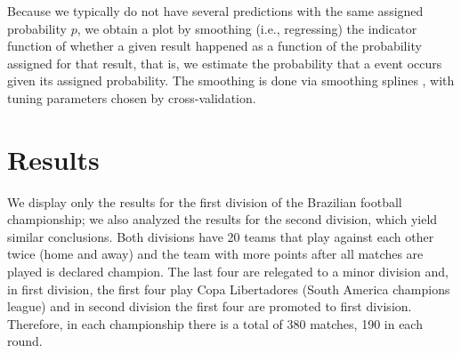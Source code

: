 \documentclass[journal,article,accept,moreauthors,pdftex,12pt,a4paper]{mdpi}
\begin{document}
Because we typically do not have several predictions with the same assigned probability $p$, we obtain a plot by smoothing (i.e., regressing) the indicator function of whether a given result happened as a function of the probability assigned for that result, that is, we estimate the probability that a event occurs given its assigned probability.
The smoothing is done via smoothing splines \cite{wahba}, with tuning parameters chosen by cross-validation.




\section{Results}
\label{sec::results}

We display only the results for the first division of the Brazilian football championship; 
we also analyzed the results for the second division, which yield similar conclusions.
Both divisions have 20 teams that play against each other twice (home and away) and the team with more points after all matches are played is declared champion.
The last four are relegated to a minor division and, in first division, the first four play Copa Libertadores (South America champions league) and in second division the first four are promoted to first division.
Therefore, in each championship there is a total of 380 matches, 190 in each round.


\end{document}

